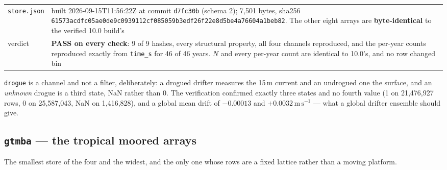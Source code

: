 \documentclass[10pt]{article}
\newcommand{\code}[1]{\texttt{#1}}
\begin{document}
\begin{table}[h]
\begin{tabular}{@{}>{\raggedright\arraybackslash}p{2.8cm}>{\raggedright\arraybackslash}p{12.5cm}@{}}
\code{store.json} & built 2026-09-15T11:56:22Z at commit \code{d7fc30b} (schema 2); 7,501 bytes, sha256 \code{61573acdfc05ae0de9c0939112cf085059b3edf26f22e8d5be4a76604a1beb82}. The other eight arrays are \textbf{byte-identical} to the verified 10.0 build's \\
verdict & \textbf{PASS on every check}: 9 of 9 hashes, every structural property, all four channels reproduced, and the per-year counts reproduced exactly from \code{time\_s} for 46 of 46 years. $N$ and every per-year count are identical to 10.0's, and no row changed bin \\
\bottomrule
\end{tabular}
\end{table}

\code{drogue} is a channel and not a filter, deliberately: a drogued drifter
measures the 15\,m current and an undrogued one the surface, and an
\emph{unknown} drogue is a third state, NaN rather than 0. The verification
confirmed exactly three states and no fourth value (1 on 21,476,927 rows, 0 on
25,587,043, NaN on 1,416,828), and a global mean drift of $-0.00013$ and
$+0.0032\,\mathrm{m\,s^{-1}}$ --- what a global drifter ensemble should give.

\subsection{\code{gtmba} --- the tropical moored arrays}

The smallest store of the four and the widest, and the only one whose rows are a
fixed lattice rather than a moving platform.
\end{document}
